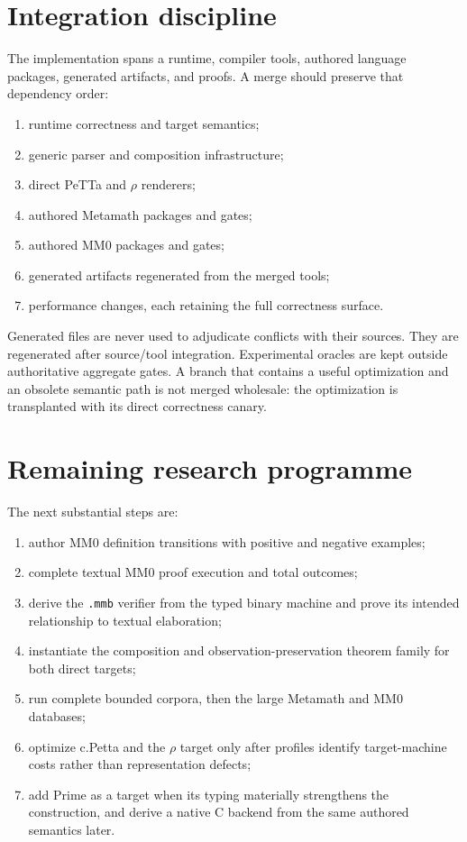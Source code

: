 \documentclass[11pt]{article}
\theoremstyle{remark}
\newcommand{\code}[1]{\texttt{#1}}
\begin{document}
\section{Integration discipline}

The implementation spans a runtime, compiler tools, authored language
packages, generated artifacts, and proofs.  A merge should preserve that
dependency order:
\begin{enumerate}
\item runtime correctness and target semantics;
\item generic parser and composition infrastructure;
\item direct PeTTa and $\rho$ renderers;
\item authored Metamath packages and gates;
\item authored MM0 packages and gates;
\item generated artifacts regenerated from the merged tools;
\item performance changes, each retaining the full correctness surface.
\end{enumerate}

Generated files are never used to adjudicate conflicts with their sources.
They are regenerated after source/tool integration.  Experimental oracles are
kept outside authoritative aggregate gates.  A branch that contains a useful
optimization and an obsolete semantic path is not merged wholesale: the
optimization is transplanted with its direct correctness canary.

\section{Remaining research programme}

The next substantial steps are:
\begin{enumerate}
\item author MM0 definition transitions with positive and negative examples;
\item complete textual MM0 proof execution and total outcomes;
\item derive the \code{.mmb} verifier from the typed binary machine and prove
      its intended relationship to textual elaboration;
\item instantiate the composition and observation-preservation theorem family
      for both direct targets;
\item run complete bounded corpora, then the large Metamath and MM0 databases;
\item optimize c.Petta and the $\rho$ target only after profiles identify
      target-machine costs rather than representation defects;
\item add Prime as a target when its typing materially strengthens the
      construction, and derive a native C backend from the same authored
      semantics later.
\end{enumerate}
\end{document}

